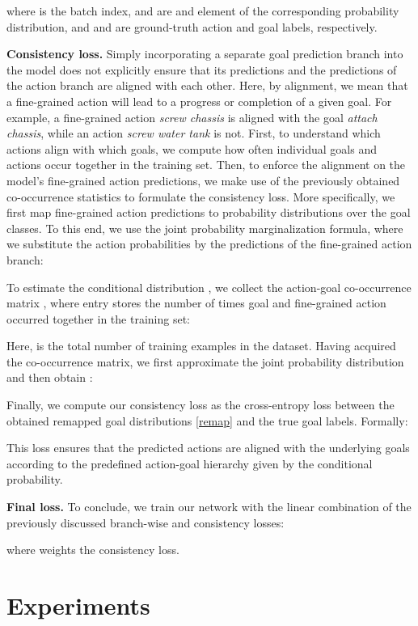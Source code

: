\documentclass{article}
\begin{document}
where  is the batch index,  and  are  and  element of the corresponding probability distribution, and  and  are ground-truth action and goal labels, respectively.

\textbf{Consistency loss.} Simply incorporating a separate goal prediction branch into the model does not explicitly ensure that its predictions and the predictions of the action branch are aligned with each other. Here, by alignment, we mean that a fine-grained action will lead to a progress or completion of a given goal. For example, a fine-grained action \textit{screw chassis} is aligned with the goal \textit{attach chassis}, while an action \textit{screw water tank} is not. First, to understand which actions align with which goals, we compute how often individual goals and actions occur together in the training set. Then, to enforce the alignment on the model's fine-grained action predictions, we make use of the previously obtained co-occurrence statistics to formulate the consistency loss. 
More specifically, we first map fine-grained action predictions to probability distributions over the goal classes. To this end, we use the joint probability marginalization formula, where we substitute the action probabilities by the predictions of the fine-grained action branch:


To estimate the conditional distribution , we collect the action-goal co-occurrence matrix , where entry  stores the number of times goal  and fine-grained action  occurred together in the training set:


Here,  is the total number of training examples in the dataset. Having acquired the co-occurrence matrix, we first approximate the joint probability distribution  and then obtain :


Finally, we compute our consistency loss as the cross-entropy loss between the obtained remapped goal distributions \eqref{remap} and the true goal labels.
Formally:

This loss ensures that the predicted actions  are aligned with the underlying goals  according to the predefined action-goal hierarchy given by the conditional probability.

\textbf{Final loss.} To conclude, we train our network with the linear combination of the previously discussed branch-wise and consistency losses:

where  weights the consistency loss. 

\vspace{-0.25cm}
\section{Experiments}
\label{sec:experiments}
\end{document}
